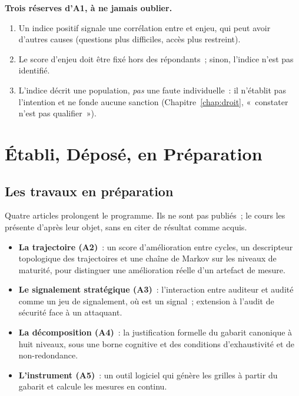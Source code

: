 \begin{boxalert}
\textbf{Trois réserves d'A1, à ne jamais oublier.}
\begin{enumerate}
    \item Un indice positif signale une corrélation entre \NEK{} et enjeu,
          qui peut avoir d'autres causes (questions plus difficiles, accès
          plus restreint).
    \item Le score d'enjeu doit être fixé hors des répondants~; sinon,
          l'indice n'est pas identifié.
    \item L'indice décrit une population, \emph{pas} une faute
          individuelle~: il n'établit pas l'intention et ne fonde aucune
          sanction (Chapitre~\ref{chap:droit}, «~constater n'est pas
          qualifier~»).
\end{enumerate}
\end{boxalert}

\section{Établi, Déposé, en Préparation}
\label{sec:c16-statut}

\subsection{Les travaux en préparation}

Quatre articles prolongent le programme. Ils ne sont pas publiés~; le
cours les présente d'après leur objet, sans en citer de résultat comme
acquis.
\begin{itemize}
    \item \textbf{La trajectoire (A2)}~: un score d'amélioration entre
          cycles, un descripteur topologique des trajectoires et une chaîne
          de Markov sur les niveaux de maturité, pour distinguer une
          amélioration réelle d'un artefact de mesure.
    \item \textbf{Le signalement stratégique (A3)}~: l'interaction entre
          auditeur et audité comme un jeu de signalement, où \NEK{} est un
          signal~; extension à l'audit de sécurité face à un attaquant.
    \item \textbf{La décomposition (A4)}~: la justification formelle du
          gabarit canonique à huit niveaux, sous une borne cognitive et des
          conditions d'exhaustivité et de non-redondance.
    \item \textbf{L'instrument (A5)}~: un outil logiciel qui génère les
          grilles à partir du gabarit et calcule les mesures en continu.
\end{itemize}

